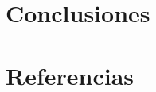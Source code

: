 \documentclass[12pt,oneside,a4paper]{reedthesis}
\begin{document}
\hypertarget{conclusiones-3}{%
\chapter{Conclusiones}\label{conclusiones-3}}

\backmatter

\hypertarget{referencias}{%
\chapter*{Referencias}\label{referencias}}


\noindent

\setlength{\parindent}{-0.20in}

\hypertarget{refs}{}
\end{document}
